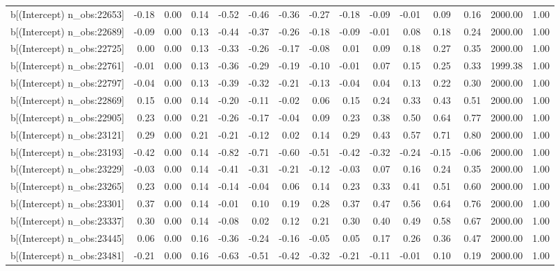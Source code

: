 \begin{table}[ht]
\begin{tabular}{rrrrrrrrrrrrrrr}
  b[(Intercept) n\_obs:22653] & -0.18 & 0.00 & 0.14 & -0.52 & -0.46 & -0.36 & -0.27 & -0.18 & -0.09 & -0.01 & 0.09 & 0.16 & 2000.00 & 1.00 \\ 
  b[(Intercept) n\_obs:22689] & -0.09 & 0.00 & 0.13 & -0.44 & -0.37 & -0.26 & -0.18 & -0.09 & -0.01 & 0.08 & 0.18 & 0.24 & 2000.00 & 1.00 \\ 
  b[(Intercept) n\_obs:22725] & 0.00 & 0.00 & 0.13 & -0.33 & -0.26 & -0.17 & -0.08 & 0.01 & 0.09 & 0.18 & 0.27 & 0.35 & 2000.00 & 1.00 \\ 
  b[(Intercept) n\_obs:22761] & -0.01 & 0.00 & 0.13 & -0.36 & -0.29 & -0.19 & -0.10 & -0.01 & 0.07 & 0.15 & 0.25 & 0.33 & 1999.38 & 1.00 \\ 
  b[(Intercept) n\_obs:22797] & -0.04 & 0.00 & 0.13 & -0.39 & -0.32 & -0.21 & -0.13 & -0.04 & 0.04 & 0.13 & 0.22 & 0.30 & 2000.00 & 1.00 \\ 
  b[(Intercept) n\_obs:22869] & 0.15 & 0.00 & 0.14 & -0.20 & -0.11 & -0.02 & 0.06 & 0.15 & 0.24 & 0.33 & 0.43 & 0.51 & 2000.00 & 1.00 \\ 
  b[(Intercept) n\_obs:22905] & 0.23 & 0.00 & 0.21 & -0.26 & -0.17 & -0.04 & 0.09 & 0.23 & 0.38 & 0.50 & 0.64 & 0.77 & 2000.00 & 1.00 \\ 
  b[(Intercept) n\_obs:23121] & 0.29 & 0.00 & 0.21 & -0.21 & -0.12 & 0.02 & 0.14 & 0.29 & 0.43 & 0.57 & 0.71 & 0.80 & 2000.00 & 1.00 \\ 
  b[(Intercept) n\_obs:23193] & -0.42 & 0.00 & 0.14 & -0.82 & -0.71 & -0.60 & -0.51 & -0.42 & -0.32 & -0.24 & -0.15 & -0.06 & 2000.00 & 1.00 \\ 
  b[(Intercept) n\_obs:23229] & -0.03 & 0.00 & 0.14 & -0.41 & -0.31 & -0.21 & -0.12 & -0.03 & 0.07 & 0.16 & 0.24 & 0.35 & 2000.00 & 1.00 \\ 
  b[(Intercept) n\_obs:23265] & 0.23 & 0.00 & 0.14 & -0.14 & -0.04 & 0.06 & 0.14 & 0.23 & 0.33 & 0.41 & 0.51 & 0.60 & 2000.00 & 1.00 \\ 
  b[(Intercept) n\_obs:23301] & 0.37 & 0.00 & 0.14 & -0.01 & 0.10 & 0.19 & 0.28 & 0.37 & 0.47 & 0.56 & 0.64 & 0.76 & 2000.00 & 1.00 \\ 
  b[(Intercept) n\_obs:23337] & 0.30 & 0.00 & 0.14 & -0.08 & 0.02 & 0.12 & 0.21 & 0.30 & 0.40 & 0.49 & 0.58 & 0.67 & 2000.00 & 1.00 \\ 
  b[(Intercept) n\_obs:23445] & 0.06 & 0.00 & 0.16 & -0.36 & -0.24 & -0.16 & -0.05 & 0.05 & 0.17 & 0.26 & 0.36 & 0.47 & 2000.00 & 1.00 \\ 
  b[(Intercept) n\_obs:23481] & -0.21 & 0.00 & 0.16 & -0.63 & -0.51 & -0.42 & -0.32 & -0.21 & -0.11 & -0.01 & 0.10 & 0.19 & 2000.00 & 1.00 \\ 

\end{tabular}
\end{table}
